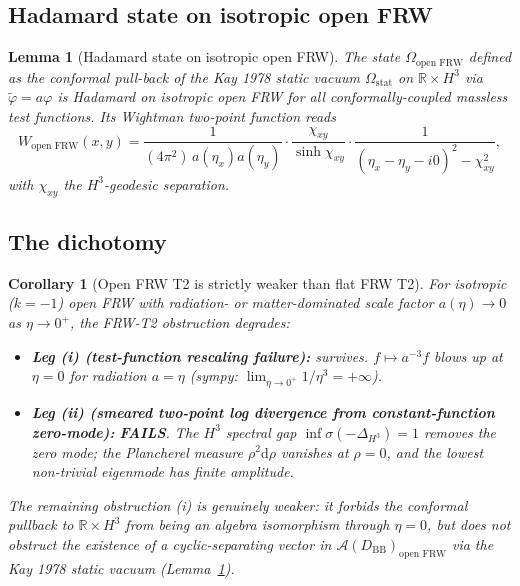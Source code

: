 \documentclass[11pt]{article}
\newtheorem{lemma}[theorem]{Lemma}
\newtheorem{corollary}[theorem]{Corollary}
\theoremstyle{definition}
\newcommand{\R}{\mathbb{R}}
\renewcommand{\AA}{\mathcal{A}}
\newcommand{\BB}{\mathrm{BB}}
\begin{document}
\subsection{Hadamard state on isotropic open FRW}\label{sec:openFRW-Hadamard}

\begin{lemma}[Hadamard state on isotropic open FRW]\label{lem:open-FRW}
The state $\Omega_{\text{open FRW}}$ defined as the conformal pull-back of the Kay 1978 static vacuum $\Omega_{\mathrm{stat}}$ on $\R\times H^3$ via $\tilde\varphi = a\varphi$ is Hadamard on isotropic open FRW for all conformally-coupled massless test functions. Its Wightman two-point function reads
\begin{equation*}
W_{\text{open FRW}}(x,y) = \frac{1}{(4\pi^2)\,a(\eta_x)a(\eta_y)}\cdot\frac{\chi_{xy}}{\sinh\chi_{xy}}\cdot\frac{1}{(\eta_x-\eta_y-i 0)^2 - \chi_{xy}^2},
\end{equation*}
with $\chi_{xy}$ the $H^3$-geodesic separation.
\end{lemma}

\subsection{The dichotomy}\label{sec:openFRW-dichotomy}

\begin{corollary}[Open FRW T2 is strictly weaker than flat FRW T2]\label{cor:openFRW}
For isotropic ($k=-1$) open FRW with radiation- or matter-dominated scale factor $a(\eta)\to 0$ as $\eta\to 0^+$, the FRW-T2 obstruction degrades:
\begin{itemize}
\item \textbf{Leg (i) (test-function rescaling failure):} survives. $f\mapsto a^{-3}f$ blows up at $\eta=0$ for radiation $a=\eta$ (sympy: $\lim_{\eta\to 0^+}1/\eta^3=+\infty$).
\item \textbf{Leg (ii) (smeared two-point log divergence from constant-function zero-mode):} \textbf{FAILS}. The $H^3$ spectral gap $\inf\sigma(-\Delta_{H^3})=1$ removes the zero mode; the Plancherel measure $\rho^2\mathrm{d}\rho$ vanishes at $\rho=0$, and the lowest non-trivial eigenmode has finite amplitude.
\end{itemize}
The remaining obstruction (i) is genuinely weaker: it forbids the conformal pullback to $\R\times H^3$ from being an algebra isomorphism through $\eta=0$, but does not obstruct the existence of a cyclic-separating vector in $\AA(D_\BB)_{\text{open FRW}}$ via the Kay 1978 static vacuum (Lemma~\ref{lem:open-FRW}).
\end{corollary}
\end{document}
